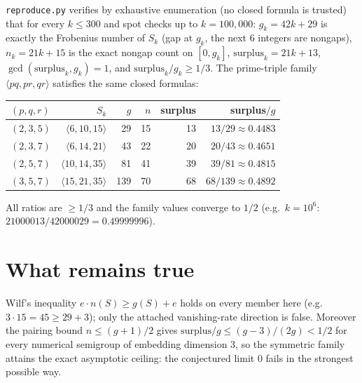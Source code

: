 \documentclass[11pt]{article}
\theoremstyle{definition}
\begin{document}
\texttt{reproduce.py} verifies by exhaustive enumeration (no closed formula is
trusted) that for every $k \le 300$ and spot checks up to $k=100{,}000$:
$g_k=42k+29$ is exactly the Frobenius number of $S_k$ (gap at $g_k$, the next
$6$ integers are nongaps), $n_k=21k+15$ is the exact nongap count on
$[0,g_k]$, $\mathrm{surplus}_k=21k+13$, $\gcd(\mathrm{surplus}_k,g_k)=1$, and
$\mathrm{surplus}_k/g_k\ge 1/3$. The prime-triple family
$\langle pq,pr,qr\rangle$ satisfies the same closed formulas:

\begin{center}
\begin{tabular}{lrrrrr}
\toprule
$(p,q,r)$ & $S_k$ & $g$ & $n$ & surplus & surplus$/g$\\
\midrule
$(2,3,5)$ & $\langle 6,10,15\rangle$ & 29 & 15 & 13 & $13/29 \approx 0.4483$\\
$(2,3,7)$ & $\langle 6,14,21\rangle$ & 43 & 22 & 20 & $20/43 \approx 0.4651$\\
$(2,5,7)$ & $\langle 10,14,35\rangle$ & 81 & 41 & 39 & $39/81 \approx 0.4815$\\
$(3,5,7)$ & $\langle 15,21,35\rangle$ & 139 & 70 & 68 & $68/139 \approx 0.4892$\\
\bottomrule
\end{tabular}
\end{center}

All ratios are $\ge 1/3$ and the family values converge to $1/2$
(e.g.\ $k=10^6$: $21000013/42000029 = 0.49999996$).

\section{What remains true}

Wilf's inequality $e\cdot n(S)\ge g(S)+e$ holds on every member here (e.g.\
$3\cdot 15 = 45 \ge 29+3$); only the attached vanishing-rate direction is
false. Moreover the pairing bound $n\le (g+1)/2$ gives
$\mathrm{surplus}/g \le (g-3)/(2g) < 1/2$ for every numerical semigroup of
embedding dimension $3$, so the symmetric family attains the exact asymptotic
ceiling: the conjectured limit $0$ fails in the strongest possible way.
\end{document}
